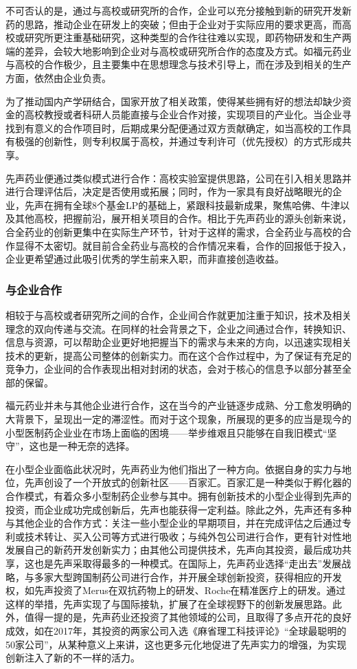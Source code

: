 \documentclass{apa6}
\begin{document}
			不可否认的是，通过与高校或研究所的合作，企业可以充分接触到新的研究开发新药的思路，推动企业在研发上的突破；但由于企业对于实际应用的要求更高，而高校或研究所更注重基础研究，这种类型的合作往往难以实现，即药物研发和生产两端的差异，会较大地影响到企业对与高校或研究所合作的态度及方式。如福元药业与高校的合作极少，且主要集中在思想理念与技术引导上，而在涉及到相关的生产方面，依然由企业负责。
			
			为了推动国内产学研结合，国家开放了相关政策，使得某些拥有好的想法却缺少资金的高校教授或者科研人员能直接与企业合作对接，实现项目的产业化。当企业寻找到有意义的合作项目时，后期成果分配便通过双方贡献确定，如当高校的工作具有极强的创新性，则专利权属于高校，并通过专利许可（优先授权）的方式形成共享。
			
			先声药业便通过类似模式进行合作：高校实验室提供思路，公司在引入相关思路并进行合理评估后，决定是否使用或拓展；同时，作为一家具有良好战略眼光的企业，先声在拥有全球8个基金LP的基础上，紧跟科技最新成果，聚焦哈佛、牛津以及其他高校，把握前沿，展开相关项目的合作。相比于先声药业的源头创新来说，合全药业的创新更集中在实际生产环节，针对于这样的需求，合全药业与高校的合作显得不太密切。就目前合全药业与高校的合作情况来看，合作的回报低于投入，企业更希望通过此吸引优秀的学生前来入职，而非直接创造收益。
			
			
			\subsubsection{与企业合作}
			
			相较于与高校或者研究所之间的合作，企业间合作就更加注重于知识，技术及相关理念的双向传递与交流。在同样的社会背景之下，企业之间通过合作，转换知识、信息与资源，可以帮助企业更好地把握当下的需求与未来的方向，以迅速实现相关技术的更新，提高公司整体的创新实力。而在这个合作过程中，为了保证有充足的竞争力，企业间的合作表现出相对封闭的状态，会对于核心的信息予以部分甚至全部的保留。
			
			福元药业并未与其他企业进行合作，这在当今的产业链逐步成熟、分工愈发明确的大背景下，呈现出一定的滞涩性。而对于这个现象，所展现的更多的应当是现今的小型医制药企业业在市场上面临的困境——举步维艰且只能够在自我旧模式“坚守”，这也是一种无奈的选择。
			
			在小型企业面临此状况时，先声药业为他们指出了一种方向。依据自身的实力与地位，先声创设了一个开放式的创新社区——百家汇。百家汇是一种类似于孵化器的合作模式，有着众多小型制药企业参与其中。拥有创新技术的小型企业得到先声的投资，而企业成功完成创新后，先声也能获得一定利益。除此之外，先声还有多种与其他企业的合作方式：关注一些小型企业的早期项目，并在完成评估之后通过专利或技术转让、买入公司等方式进行吸收；与纯外包公司进行合作，更有针对性地发展自己的新药开发创新实力；由其他公司提供技术，先声向其投资，最后成功共享，这也是先声采取得最多的一种模式。在国际上，先声药业选择“走出去”发展战略，与多家大型跨国制药公司进行合作，并开展全球创新投资，获得相应的开发权，如先声投资了Merus在双抗药物上的研发、Roche在精准医疗上的研发。通过这样的举措，先声实现了与国际接轨，扩展了在全球视野下的创新发展思路。此外，值得一提的是，先声药业还投资了其他领域的公司，且取得了多点开花的良好成效，如在2017年，其投资的两家公司入选《麻省理工科技评论》“全球最聪明的50家公司”，从某种意义上来讲，这也更多元化地促进了先声实力的增强，为实现创新注入了新的不一样的活力\citep{RN5}。
			
\end{document}
